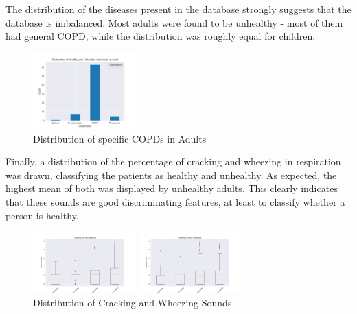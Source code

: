 \documentclass[10pt,twocolumn,letterpaper]{article}
\begin{document}

The distribution of the diseases present in the database strongly suggests that the database is imbalanced. Most adults were found to be unhealthy -
most of them had general COPD, while the distribution was roughly equal for children.
\begin{figure}[htbp]
    \centerline{\includegraphics[width=0.35\textwidth]{adult_unhealthy.jpg}}
    \caption{Distribution of specific COPDs in Adults}
    \label{fig:adult_unhealhty}
\end{figure}

Finally, a distribution of the percentage of cracking and wheezing in respiration was drawn, classifying the patients as healthy and unhealthy. As expected, the highest mean of both was displayed by unhealthy adults. This clearly indicates that these sounds are good discriminating features, at least to classify whether a person is healthy.
\begin{figure}[htbp]
    \centerline{\includegraphics[width=0.35\textwidth]{cracking.jpg}}
    \centerline{\includegraphics[width=0.35\textwidth]{wheezing.jpg}}
    \caption{Distribution of Cracking and Wheezing Sounds}
    \label{fig:unhealhty-distro}
\end{figure}
\end{document}
